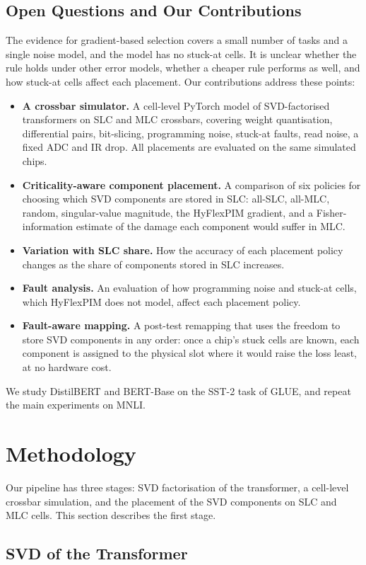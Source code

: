 \documentclass[conference]{IEEEtran}
\begin{document}
\subsection{Open Questions and Our Contributions}
The evidence for gradient-based selection covers a small number of tasks and a single noise model, and the
model has no stuck-at cells. It is unclear whether the rule holds under other error models, whether a
cheaper rule performs as well, and how stuck-at cells affect each placement. Our contributions address
these points:
\begin{itemize}
\item \textbf{A crossbar simulator.} A cell-level PyTorch model of SVD-factorised transformers on SLC and
MLC crossbars, covering weight quantisation, differential pairs, bit-slicing, programming noise, stuck-at
faults, read noise, a fixed ADC and IR drop. All placements are evaluated on the same simulated chips.
\item \textbf{Criticality-aware component placement.} A comparison of six policies for choosing which SVD
components are stored in SLC: all-SLC, all-MLC, random, singular-value magnitude, the HyFlexPIM gradient,
and a Fisher-information estimate of the damage each component would suffer in MLC.
\item \textbf{Variation with SLC share.} How the accuracy of each placement policy changes as the share of
components stored in SLC increases.
\item \textbf{Fault analysis.} An evaluation of how programming noise and stuck-at cells, which HyFlexPIM
does not model, affect each placement policy.
\item \textbf{Fault-aware mapping.} A post-test remapping that uses the freedom to store SVD components in
any order: once a chip's stuck cells are known, each component is assigned to the physical slot where it
would raise the loss least, at no hardware cost.
\end{itemize}
We study DistilBERT and BERT-Base on the SST-2 task of GLUE, and repeat the main experiments on MNLI.

\section{Methodology}
Our pipeline has three stages: SVD factorisation of the transformer, a cell-level crossbar simulation, and
the placement of the SVD components on SLC and MLC cells. This section describes the first stage.

\subsection{SVD of the Transformer}
\end{document}
